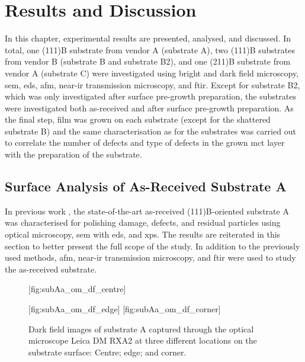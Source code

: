 \chapter{Results and Discussion}\label{ch:results-and-discussion}
In this chapter, experimental results are presented, analysed, and discussed. In total, one (111)B substrate from vendor A (substrate A), two (111)B substrates from vendor B (substrate B and substrate B2), and one (211)B substrate from vendor A (substrate C) were investigated using bright and dark field microscopy, \ac{sem}, \ac{eds}, \ac{afm}, near-\ac{ir} transmission microscopy, and \ac{ftir}. Except for substrate B2, which was only investigated after surface pre-growth preparation, the substrates were investigated both as-received and after surface pre-growth preparation. As the final step,  film was grown on each substrate (except for the shattered substrate B) and the same characterisation as for the substrates was carried out to correlate the number of defects and type of defects in the grown \ac{mct} layer with the preparation of the substrate.
\section{Surface Analysis of As-Received Substrate A}\label{sec:subAa}
In previous work \citep{lauten2017characterisation}, the state-of-the-art as-received (111)B-oriented substrate A was characterised for polishing damage, defects, and residual particles using optical microscopy, \ac{sem} with \ac{eds}, and \ac{xps}. The results are reiterated in this section to better present the full scope of the study. In addition to the previously used methods, \ac{afm}, near-\ac{ir} transmission microscopy, and \ac{ftir} were used to study the as-received substrate.

\begin{figure}[htbp]
    \centering
    [fig:subAa_om_df_centre]
    \par\bigskip
    [fig:subAa_om_df_edge]
    \hfill
    [fig:subAa_om_df_corner]
    \caption[Dark field images of substrate A.]{Dark field images of substrate A captured through the optical microscope Leica DM RXA2 at three different locations on the substrate surface:  Centre;  edge; and  corner.}
    \label{fig:subAa_om_df}
\end{figure}

